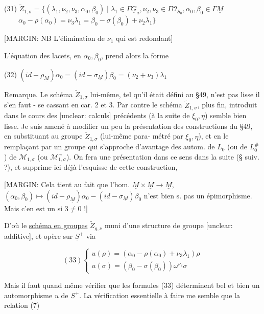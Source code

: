 \newpage


(31) $\widetilde{Z}_{1,\sigma} = \{ (\lambda_1, \nu_2, \nu_3, \alpha_0, \beta_0) \mid \lambda_1 \in \Gamma \underline{G}_a, \nu_2, \nu_3 \in \Gamma \mathcal{O}_{S_0}, \alpha_0, \beta_0 \in \Gamma \underline{M}$
$\qquad \alpha_0 - \rho(\alpha_0) = \nu_3 \lambda_1 = \beta_0 - \sigma(\beta_0) + \nu_2 \lambda_1 \}$

[MARGIN: NB L'élimination de $\nu_1$ qui est redondant]

L'équation des lacets, en $\alpha_0, \beta_0$, prend alors la forme

(32) $(id - \rho_{\underline{M}})\alpha_0 = (id - \sigma_{\underline{M}})\beta_0 = (\nu_2 + \nu_3)\lambda_1$

Remarque. Le schéma $\widetilde{Z}_{1,\sigma}$ lui-même, tel qu'il
était défini au §49, n'est pas lisse
il s'en faut - se cassant en car. 2 et 3.
Par contre le schéma $\widetilde{Z}_{1,\sigma}$, plus fin,
introduit dans le cours des
[unclear: calculs] précédents (à la suite de $\xi_0, \eta$)
semble bien lisse. Je suis amené à
modifier un peu la présentation des
constructions du §49, en substituant
au groupe $\widetilde{Z}_{1,\sigma}$ (lui-même para-
métré par $\xi_0, \eta$), et en le remplaçant par
un groupe qui s'approche d'avantage
des autom. de $L_0$ (ou de $L_0^\#$) de $\mathcal{M}_{1,\sigma}$
(ou $\mathcal{M}_{1,\sigma}^\sim$). On fera une présentation dans
ce sens dans la suite (§ suiv. ?), et
supprime ici déjà l'esquisse de cette construction,

[MARGIN: Cela tient au fait que l'hom. $\underline{M} \times \underline{M} \to \underline{M}$, $(\alpha_0, \beta_0) \mapsto (id - \rho_{\underline{M}})\alpha_0 - (id - \sigma_{\underline{M}})\beta_0$ n'est bien s. pas un épimorphisme. Mais c'en est un si $3 \neq 0$ !]

\newpage


D'où le \underline{schéma en groupes} $\widetilde{Z}_{g,\nu}$ muni d'une structure de groupe [unclear: additive], et opère sur $\underline{S}^+$ via

$$ (33) \left\{ \begin{array}{l} u(\rho) = (\alpha_0 - \rho(\alpha_0) + \nu_3 \lambda_1)\rho \\ u(\sigma) = (\beta_0 - \sigma(\beta_0) ) \omega^{\nu_2} \sigma \end{array} \right. $$

Mais il faut quand même vérifier que les formules (33) déterminent bel et bien un automorphisme $u$ de $\underline{S}^+$. La vérification essentielle à faire me semble que la relation (7)


